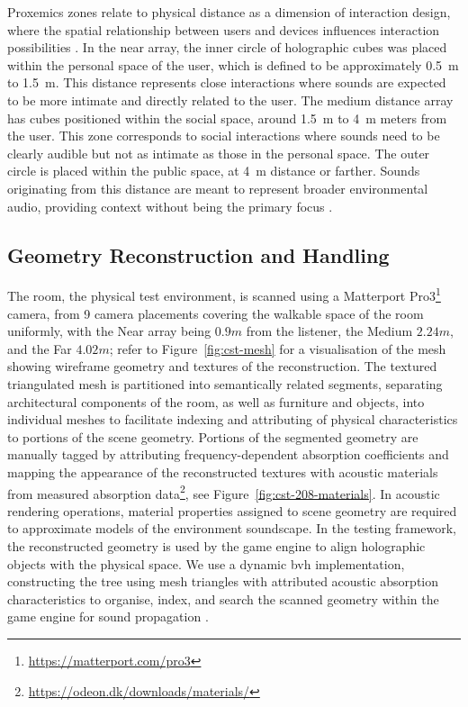 Proxemics zones relate to physical distance as a dimension of interaction design, where the spatial relationship between users and devices influences interaction possibilities \citep{huang2022proxemics}. In the near array, the inner circle of holographic cubes was placed within the personal space of the user, which is defined to be approximately \qty{0.5}{\metre} to \qty{1.5}{\metre}. This distance represents close interactions where sounds are expected to be more intimate and directly related to the user. The medium distance array has cubes positioned within the social space, around \qty{1.5}{\metre} to \qty{4}{\metre} meters from the user. This zone corresponds to social interactions where sounds need to be clearly audible but not as intimate as those in the personal space. The outer circle is placed within the public space, at \qty{4}{\metre} distance or farther. Sounds originating from this distance are meant to represent broader environmental audio, providing context without being the primary focus \citep{buschel2021miria}.

\subsection{Geometry Reconstruction and Handling}
The room, the physical test environment, is scanned using a Matterport Pro3\footnote{\url{https://matterport.com/pro3}} camera, from 9 camera placements covering the walkable space of the room uniformly, with the Near array being $0.9m$ from the listener, the Medium $2.24m$, and the Far $4.02m$;  refer to Figure~\ref{fig:cst-mesh} for a visualisation of the mesh showing wireframe geometry and textures of the reconstruction. The textured triangulated mesh is partitioned into semantically related segments, separating architectural components of the room, as well as furniture and objects, into individual meshes to facilitate indexing and attributing of physical characteristics to portions of the scene geometry. Portions of the segmented geometry are manually tagged by attributing frequency-dependent absorption coefficients and mapping the appearance of the reconstructed textures with acoustic materials from measured absorption data\footnote{\url{https://odeon.dk/downloads/materials/}}, see Figure~\ref{fig:cst-208-materials}. In acoustic rendering operations, material properties assigned to scene geometry are required to approximate models of the environment soundscape. 
In the testing framework, the reconstructed geometry is used by the game engine to align holographic objects with the physical space. We use a dynamic \acrshort{bvh} implementation, constructing the tree using mesh triangles with attributed acoustic absorption characteristics to organise, index, and search the scanned geometry within the game engine for sound propagation \citep{kopta2012fast}.\par

